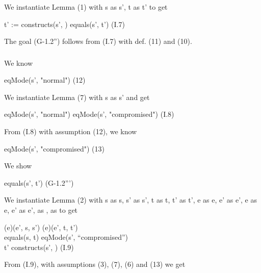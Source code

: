 \documentclass[conference]{IEEEtran}
\begin{document}
\noindent We instantiate Lemma (1) with
s as s', t as t' to get
\begin{center}
t' := constructs(s', )  equals(s', t')  \hspace*{1cm} (I.7)
\end{center}

\noindent The goal (G-1.2'') follows from (I.7) with def. (11) and (10).

\subsubsection*{}

\noindent We know

\begin{center}
 eqMode(s', "normal")  \hspace*{1cm} (12)
\end{center}

\noindent We instantiate Lemma (7) with
s as s' and get

\begin{center}
 eqMode(s', "normal")  eqMode(s', "compromised")  \hspace*{0.3cm} (I.8)
\end{center}

\noindent From (I.8) with assumption (12), we know

\begin{center}
eqMode(s', "compromised")  \hspace*{0.7cm} (13)
\end{center}

\noindent We show
\begin{center}
 equals(s', t')  \hspace*{3cm} (G-1.2''')
\end{center}

\noindent We instantiate Lemma (2) with
s as s, s' as s', t as t, t' as t', e as e, e' as e', e as e, e' as e',  as ,  as  to get

\begin{tabbing}
\textlbrackdbl \textrbrackdbl(e)(e', s, s')  \textlbrackdbl \textrbrackdbl(e)(e', t, t') 
\\ equals(s, t)  eqMode(s', ``compromised'') 
\\ t'  constructs(s', )  \hspace*{3cm} (I.9)
 \end{tabbing}

\noindent From (I.9), with assumptions (3), (7), (6) and (13) we get
\end{document}
